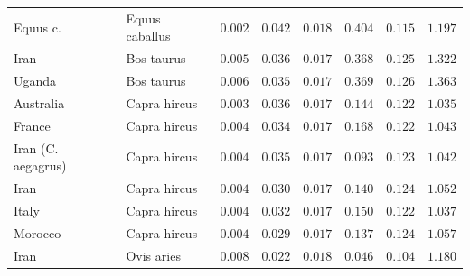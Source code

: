 \documentclass{article}
\begin{document}
\begin{center}
\begin{longtable*}{|l|l|r|r|r|r|r|r|}
            \bottomrule
            \endlastfoot
            Equus c.             & Equus caballus      & $ 0.002$        & $ 0.042$                   & $ 0.018$                      & $ 0.404$                             & $ 0.115$                      & $ 1.197$           \\
            Iran                 & Bos taurus          & $ 0.005$        & $ 0.036$                   & $ 0.017$                      & $ 0.368$                             & $ 0.125$                      & $ 1.322$           \\
            Uganda               & Bos taurus          & $ 0.006$        & $ 0.035$                   & $ 0.017$                      & $ 0.369$                             & $ 0.126$                      & $ 1.363$           \\
            Australia            & Capra hircus        & $ 0.003$        & $ 0.036$                   & $ 0.017$                      & $ 0.144$                             & $ 0.122$                      & $ 1.035$           \\
            France               & Capra hircus        & $ 0.004$        & $ 0.034$                   & $ 0.017$                      & $ 0.168$                             & $ 0.122$                      & $ 1.043$           \\
            Iran (C. aegagrus)   & Capra hircus        & $ 0.004$        & $ 0.035$                   & $ 0.017$                      & $ 0.093$                             & $ 0.123$                      & $ 1.042$           \\
            Iran                 & Capra hircus        & $ 0.004$        & $ 0.030$                   & $ 0.017$                      & $ 0.140$                             & $ 0.124$                      & $ 1.052$           \\
            Italy                & Capra hircus        & $ 0.004$        & $ 0.032$                   & $ 0.017$                      & $ 0.150$                             & $ 0.122$                      & $ 1.037$           \\
            Morocco              & Capra hircus        & $ 0.004$        & $ 0.029$                   & $ 0.017$                      & $ 0.137$                             & $ 0.124$                      & $ 1.057$           \\
            Iran                 & Ovis aries          & $ 0.008$        & $ 0.022$                   & $ 0.018$                      & $ 0.046$                             & $ 0.104$                      & $ 1.180$           \\

\end{longtable*}
\end{center}
\end{document}
